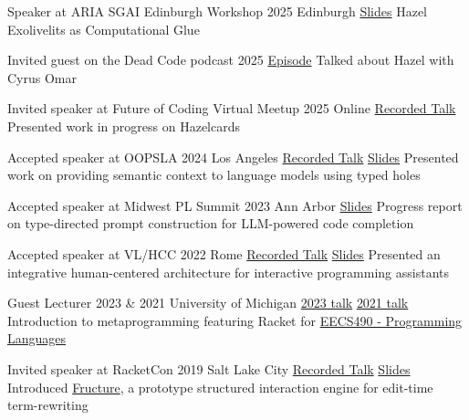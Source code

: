 \documentclass[10pt,a4paper]{article}
\begin{document}
\headedsubsection
{Speaker at ARIA SGAI Edinburgh Workshop}
{2025 \sbull Edinburgh \sbull \href{https://andrewblinn.com/papers/aria-hazel-exolivelits-lightning-talk.pdf}{Slides}}
{Hazel Exolivelits as Computational Glue}

\headedsubsection
{Invited guest on the Dead Code podcast}
{2025 \sbull \href{https://shows.acast.com/dead-code/episodes/hole-y-diver-with-cyrus-omar-and-andrew-blinn}{Episode}}
{Talked about Hazel with Cyrus Omar}

\headedsubsection
{Invited speaker at Future of Coding Virtual Meetup}
{2025 \sbull Online \sbull \href{https://www.youtube.com/watch?v=mz1F55UoVQs&t=1139s}{Recorded Talk}}
{Presented work in progress on Hazelcards}

\headedsubsection
{Accepted speaker at OOPSLA}
{2024 \sbull Los Angeles \sbull
  \href{https://www.youtube.com/watch?v=-DYe8Fi78sg&t=12703s}{Recorded Talk} \sbull
\href{https://andrewblinn.com/papers/OOPSLA24.slides.Statically.Contextualizing.LLMs.pdf}{Slides}}
{Presented work on providing semantic context to language models using typed holes}

\headedsubsection
{Accepted speaker at Midwest PL Summit}
{2023 \sbull Ann Arbor \sbull \href{http://andrewblinn.com/papers/2023-MWPLS-Type-directed-Prompt-Construction-for-LLM-powered-Programming-Assistants.pdf}{Slides}}
{Progress report on type-directed prompt construction for LLM-powered code completion}

\headedsubsection
{Accepted speaker at VL/HCC}
{2022 \sbull
  Rome \sbull
  \href{https://www.youtube.com/watch?v=G_9Yyut3ckw}{Recorded Talk} \sbull \href{https://docs.google.com/presentation/d/1lrclRzlx-ayd_iqOENyvCtnexBgTpkaSltPmgQQi_IE/edit?usp=sharing}{Slides}
}
{Presented an integrative human-centered architecture for interactive programming assistants}

\headedsubsection
{Guest Lecturer}
{2023 \& 2021 \sbull University of Michigan \sbull \href{https://www.youtube.com/watch?v=G9lcHDCkTs8}{2023 talk} \sbull \href{https://www.youtube.com/watch?v=pDKc14OCu9Q}{2021 talk} }
{Introduction to metaprogramming featuring Racket for \href{https://eecs490.github.io/eecs490.org/}{EECS490 - Programming Languages}}

\headedsubsection
{Invited speaker at RacketCon}
{2019 \sbull
  Salt Lake City \sbull
\href{https://www.youtube.com/watch?v=CnbVCNIh1NA}{Recorded Talk} \sbull \href{https://github.com/disconcision/fructure/blob/master/screenshots/REAL-RacketCon-Fructure-Talk.pdf}{Slides}}
{Introduced \href{https://github.com/disconcision/fructure}{Fructure}, a prototype structured interaction engine for edit-time term-rewriting}
\end{document}

